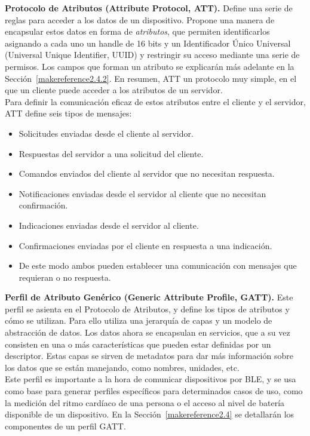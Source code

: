 \textbf{Protocolo de Atributos (Attribute Protocol, ATT).} Define una serie de reglas para acceder a los datos de un dispositivo. Propone una manera de encapsular estos datos en forma de \textit{atributos}, que permiten identificarlos asignando a cada uno un handle de 16 bits y un Identificador Único Universal (Universal Unique Identifier, UUID) y restringir su acceso mediante una serie de permisos. Los campos que forman un atributo se explicarán más adelante en la Sección~\ref{makereference2.4.2}. En resumen, ATT un protocolo muy simple, en el que un cliente puede acceder a los atributos de un servidor.\\
Para definir la comunicación eficaz de estos atributos entre el cliente y el servidor, ATT define seis tipos de mensajes:
\begin{itemize} %
	\item Solicitudes enviadas desde el cliente al servidor.
	\item Respuestas del servidor a una solicitud del cliente.
	\item Comandos enviados del cliente al servidor que no necesitan respuesta. 
	\item Notificaciones enviadas desde el servidor al cliente que no necesitan confirmación.
	\item Indicaciones enviadas desde el servidor al cliente.
	\item Confirmaciones enviadas por el cliente en respuesta a una indicación.
	\item De este modo ambos pueden establecer una comunicación con mensajes que requieran o no respuesta.
\end{itemize}


\textbf{Perfil de Atributo Genérico (Generic Attribute Profile, GATT).} Este perfil se asienta en el Protocolo de Atributos, y define los tipos de atributos y cómo se utilizan. 
Para ello utiliza una jerarquía de capas y un modelo de abstracción de datos. Los datos ahora se encapsulan en servicios, que a su vez consisten en una o más características que pueden estar definidas por un descriptor. Estas capas se sirven de metadatos para dar más información sobre los datos que se están manejando, como nombres, unidades, etc.\\
Este perfil es importante a la hora de comunicar dispositivos por BLE, y se usa como base para generar perfiles específicos para determinados casos de uso, como la medición del ritmo cardíaco de una persona o el acceso al nivel de batería disponible de un dispositivo. En la Sección~\ref{makereference2.4} se detallarán los componentes de un perfil GATT.



